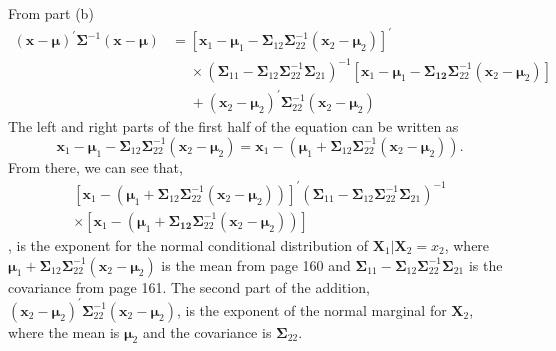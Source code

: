 \begin{enumerate}[label=(\alph*)]
    From part (b)
    \begin{equation*}
        \begin{aligned}
            {\left(\textbf{x} - \bm{\mu}\right)}^{\prime}\bm{\Sigma}^{-1}\left(\textbf{x} - \bm{\mu}\right)
            & =
            {[\textbf{x}_{1} - \bm{\mu}_{1} - \bm{\Sigma}_{12}\bm{\Sigma}_{22}^{-1}(\textbf{x}_{2} - \bm{\mu}_{2})]}^{\prime} \\
            & \phantom{=}\times {(\bm{\Sigma}_{11} - \bm{\Sigma}_{12}\bm{\Sigma}_{22}^{-1}\bm{\Sigma}_{21})}^{-1}[\textbf{x}_{1} - \bm{\mu}_{1} - \bm{\Sigma_{12}}\bm{\Sigma}_{22}^{-1}(\textbf{x}_2 - \bm{\mu}_{2})]\\
            & \phantom{=}+{(\textbf{x}_{2} - \bm{\mu}_{2})}^{\prime}\bm{\Sigma}_{22}^{-1}(\textbf{x}_{2} - \bm{\mu}_{2})
        \end{aligned} 
    \end{equation*}
    The left and right parts of the first half of the equation can be written as
    \[
        \textbf{x}_{1} - \bm{\mu}_{1} - \bm{\Sigma}_{12}\bm{\Sigma}_{22}^{-1}(\textbf{x}_{2} - \bm{\mu}_{2})
        =
        \textbf{x}_{1} - \left( \bm{\mu}_{1} + \bm{\Sigma}_{12}\bm{\Sigma}_{22}^{-1}(\textbf{x}_{2} - \bm{\mu}_{2}) \right).
    \]
    From there, we can see that, 
    \begin{multline*}
        {[\textbf{x}_{1} - (\bm{\mu}_{1} + \bm{\Sigma}_{12}\bm{\Sigma}_{22}^{-1}(\textbf{x}_{2} - \bm{\mu}_{2}))]}^{\prime}
    {(\bm{\Sigma}_{11} - \bm{\Sigma}_{12}\bm{\Sigma}_{22}^{-1}\bm{\Sigma}_{21})}^{-1} \\
    \times
    [\textbf{x}_{1} - (\bm{\mu}_{1} + \bm{\Sigma_{12}}\bm{\Sigma}_{22}^{-1}(\textbf{x}_2 - \bm{\mu}_{2}))]
    \end{multline*}
    , is the exponent for the normal conditional distribution of $\textbf{X}_1 \big| \textbf{X}_2 = x_2$, where $\bm{\mu}_{1} + \bm{\Sigma}_{12}\bm{\Sigma}_{22}^{-1}(\textbf{x}_{2} - \bm{\mu}_{2})$ is the mean from page 160 and $\bm{\Sigma}_{11} - \bm{\Sigma}_{12}\bm{\Sigma}_{22}^{-1}\bm{\Sigma}_{21}$ is the covariance from page 161.
    \newline
    The second part of the addition, ${(\textbf{x}_{2} - \bm{\mu}_{2})}^{\prime}\bm{\Sigma}_{22}^{-1}(\textbf{x}_{2} - \bm{\mu}_{2})$, is the exponent of the normal marginal for $\textbf{X}_2$, where the mean is $\bm{\mu}_2$ and the covariance is $\bm{\Sigma}_{22}$.
\end{enumerate}

